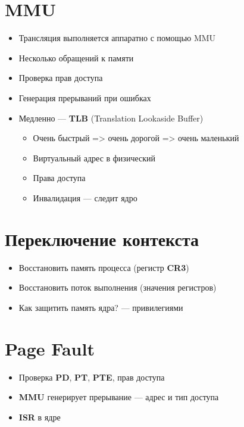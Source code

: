 \documentclass[../../lectures.tex]{subfiles}
\begin{document}
\section{MMU}
\begin{itemize}
    \item Трансляция выполняется аппаратно с помощью MMU
    \item Несколько обращений к памяти
    \item Проверка прав доступа
    \item Генерация прерываний при ошибках
    \item Медленно --- \textbf{TLB} (Translation Lookaside Buffer)
          \begin{itemize}
            \item Очень быстрый => очень дорогой => очень маленький
            \item Виртуальный адрес в физический
            \item Права доступа
            \item Инвалидация --- следит ядро
          \end{itemize}
\end{itemize}

\section{Переключение контекста}
\begin{itemize}
    \item Восстановить память процесса (регистр \textbf{CR3})
    \item Восстановить поток выполнения (значения регистров)
    \item Как защитить память ядра? --- привилегиями
\end{itemize}

\section{Page Fault}
\begin{itemize}
    \item Проверка \textbf{PD}, \textbf{PT}, \textbf{PTE}, прав доступа
    \item \textbf{MMU} генерирует прерывание --- адрес и тип доступа
    \item \textbf{ISR} в ядре
\end{itemize}
\end{document}
